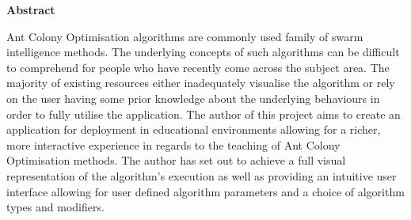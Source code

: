 \thispagestyle{empty}

\begin{center}
    {\LARGE\bf Abstract}
\end{center}
Ant Colony Optimisation algorithms are commonly used family of swarm intelligence methods. The underlying concepts of such algorithms can be difficult to comprehend for people who have recently come across the subject area. The majority of existing resources either inadequately visualise the algorithm or rely on the user having some prior knowledge about the underlying behaviours in order to fully utilise the application. The author of this project aims to create an application for deployment in educational environments allowing for a richer, more interactive experience in regards to the teaching of Ant Colony Optimisation methods. The author has set out to achieve a full visual representation of the algorithm's execution as well as providing an intuitive user interface allowing for user defined algorithm parameters and a choice of algorithm types and modifiers.